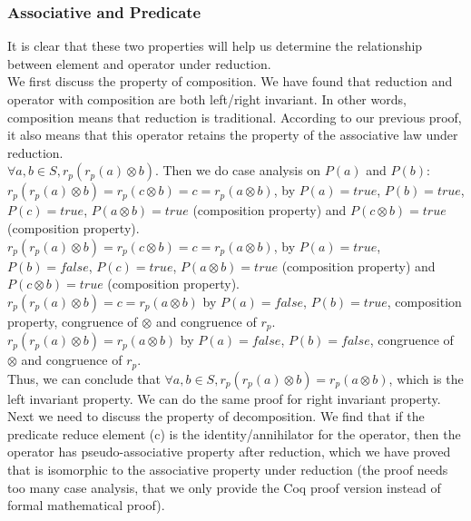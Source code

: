 \documentclass[a4paper,10pt]{article}
\begin{document}
\subsubsection{Associative and Predicate}
It is clear that these two properties will help us determine the relationship between element and operator under reduction.\\
We first discuss the property of composition. 
We have found that reduction and operator with composition are both left/right invariant.
In other words, composition means that reduction is traditional. According to our previous proof, it also means that this operator retains the property of the associative law under reduction.\\
$\forall a,b \in S, r_p(r_p(a) \otimes b)$. Then we do case analysis on $P(a)$ and $P(b)$:\\
$r_p(r_p(a) \otimes b) = r_p(c \otimes b) = c = r_p(a \otimes b)$, by $P(a) = true$, $P(b) = true$, $P(c) = true$, $P(a \otimes b) = true$ (composition property) and $P(c \otimes b) = true$ (composition property).\\
$r_p(r_p(a) \otimes b) = r_p(c \otimes b) = c = r_p(a \otimes b)$, by $P(a) = true$, $P(b) = false$, $P(c) = true$, $P(a \otimes b) = true$ (composition property) and $P(c \otimes b) = true$ (composition property).\\
$r_p(r_p(a) \otimes b) = c = r_p(a \otimes b)$ by $P(a) = false$, $P(b) = true$, composition property, congruence of $\otimes$ and congruence of $r_p$.\\
$r_p(r_p(a) \otimes b) = r_p(a \otimes b)$ by $P(a) = false$, $P(b) = false$, congruence of $\otimes$ and congruence of $r_p$.\\
Thus, we can conclude that $\forall a,b \in S, r_p(r_p(a) \otimes b) = r_p(a \otimes b)$, which is the left invariant property. We can do the same proof for right invariant property.\\
Next we need to discuss the property of decomposition. We find that if the predicate reduce element (c) is the identity/annihilator for the operator, then the operator has pseudo-associative property after reduction, which we have proved that is isomorphic to the associative property under reduction (the proof needs too many case analysis, that we only provide the Coq proof version instead of formal mathematical proof).\\
\end{document}
